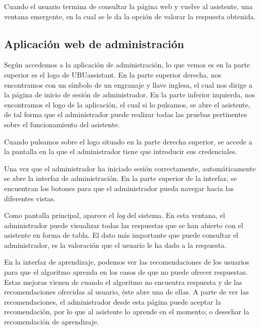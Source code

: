 Cuando el usuario termina de consultar la página web y vuelve al asistente, una ventana emergente, en la cual se le da la opción de valorar la respuesta obtenida.


\subsection{Aplicación web de administración}

Según accedemos a la aplicación de administración, lo que vemos es en la parte superior es el logo de UBUassistant. En la parte superior derecha, nos encontramos con un símbolo de un engranaje y llave inglesa, el cual nos dirige a la página de inicio de sesión de administrador. En la parte inferior izquierda, nos encontramos el logo de la aplicación, el cual si lo pulsamos, se abre el asistente, de tal forma que el administrador puede realizar todas las pruebas pertinentes sobre el funcionamiento del asistente.


Cuando pulsamos sobre el logo situado en la parte derecha superior, se accede a la pantalla en la que el administrador tiene que introducir sus credenciales.


Una vez que el administrador ha iniciado sesión correctamente, automáticamente se abre la interfaz de administración. En la parte superior de la interfaz, se encuentran los botones para que el administrador pueda navegar hacia las diferentes vistas.

Como pantalla principal, aparece el \textit{log} del sistema. En esta ventana, el administrador puede visualizar todas las respuestas que se han abierto con el asistente en forma de tabla. El dato más importante que puede consultar el administrador, es la valoración que el usuario le ha dado a la respuesta.


En la interfaz de aprendizaje, podemos ver las recomendaciones de los usuarios para que el algoritmo aprenda en los casos de que no puede ofrecer respuestas. Estas mejoras vienen de cuando el algoritmo no encuentra respuesta y de las recomendaciones ofrecidas al usuario, éste abre una de ellas. A parte de ver las recomendaciones, el administrador desde esta página puede aceptar la recomendación, por lo que al asistente lo aprende en el momento; o desechar la recomendación de aprendizaje.

